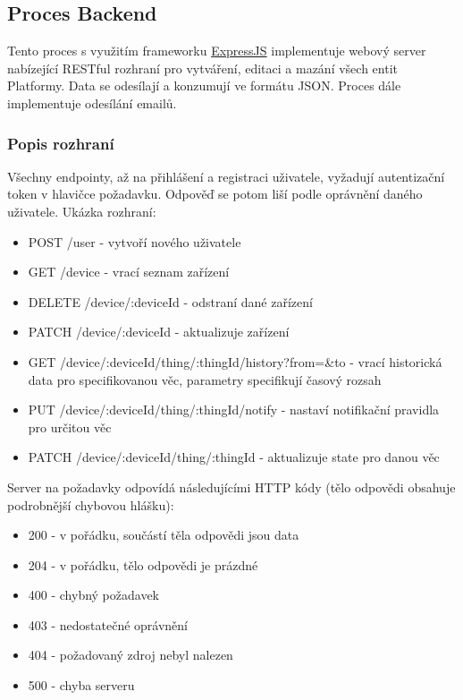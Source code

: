 \subsection{Proces Backend}
Tento proces s využitím frameworku \hyperref[expressjs]{ExpressJS} implementuje webový server nabízející RESTful rozhraní pro vytváření, editaci a mazání všech entit Platformy. Data se odesílají a konzumují ve formátu JSON. Proces dále implementuje odesílání emailů.

\subsubsection{Popis rozhraní}
Všechny endpointy, až na přihlášení a registraci uživatele, vyžadují autentizační token v hlavičce požadavku. Odpověď se potom liší podle oprávnění daného uživatele. Ukázka rozhraní:
\begin{itemize}
    \item POST /user - vytvoří nového uživatele
    \item GET /device - vrací seznam zařízení
    \item DELETE /device/:deviceId - odstraní dané zařízení
    \item PATCH /device/:deviceId - aktualizuje zařízení
    \item GET /device/:deviceId/thing/:thingId/history?from=\&to - vrací historická data pro specifikovanou věc, parametry specifikují časový rozsah
    \item PUT /device/:deviceId/thing/:thingId/notify - nastaví notifikační pravidla pro určitou věc
    \item PATCH /device/:deviceId/thing/:thingId - aktualizuje state pro danou věc
\end{itemize}

Server na požadavky odpovídá následujícími HTTP kódy (tělo odpovědi obsahuje podrobnější chybovou hlášku):
\begin{itemize}
    \item 200 - v pořádku, součástí těla odpovědi jsou data
    \item 204 - v pořádku, tělo odpovědi je prázdné
    \item 400 - chybný požadavek
    \item 403 - nedostatečné oprávnění
    \item 404 - požadovaný zdroj nebyl nalezen
    \item 500 - chyba serveru
\end{itemize}


